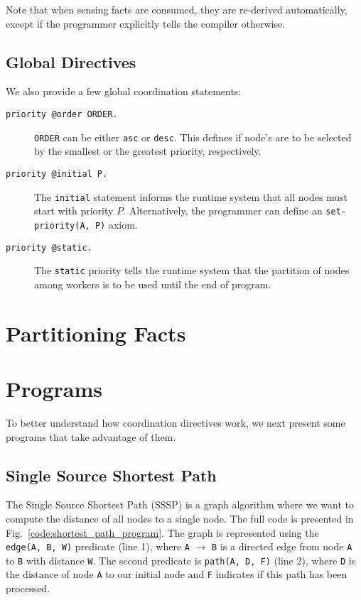 Note that when sensing facts are consumed, they are re-derived automatically, except if the programmer explicitly tells the compiler otherwise. 

\subsection{Global Directives}

We also provide a few global coordination statements:

\begin{description}
   \item[\texttt{priority @order ORDER.}] \texttt{ORDER} can be either \texttt{asc} or \texttt{desc}. This defines if node's are to be selected by the smallest or the greatest priority, respectively.
   \item[\texttt{priority @initial P.}] The \texttt{initial} statement informs the runtime system that all nodes must start with priority $P$. Alternatively, the programmer can define an \texttt{set-priority(A, P)} axiom.
   \item[\texttt{priority @static.}] The \texttt{static} priority tells the runtime system that the partition of nodes among workers is to be used until the end of program. 
\end{description}

\section{Partitioning Facts}

\section{Programs}

To better understand how coordination directives work, we next present some programs that
take advantage of them.

\subsection{Single Source Shortest Path}

The Single Source Shortest Path (SSSP) is a graph algorithm where we want to compute the
distance of all nodes to a single node. The full code is presented in Fig.~\ref{code:shortest_path_program}.
The graph is represented using the \texttt{edge(A,~B,~W)} predicate (line 1), where
\texttt{A} $\rightarrow$ \texttt{B} is a directed edge from node \texttt{A} to \texttt{B}
with distance \texttt{W}. The second predicate is \texttt{path(A,~D,~F)} (line 2), where
\texttt{D} is the distance of node \texttt{A} to our initial node and \texttt{F}
indicates if this path has been processed.

